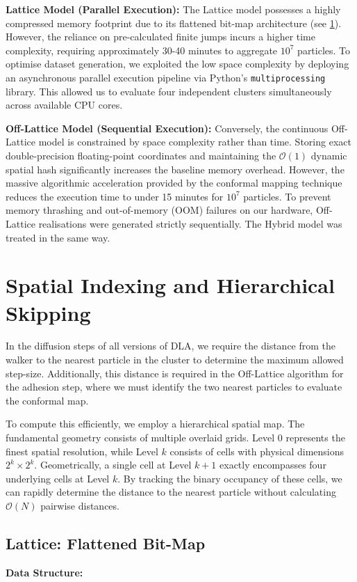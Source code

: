 \documentclass[12pt, a4paper, oneside]{report}
\theoremstyle{remark}
\begin{document}
\noindent \textbf{Lattice Model (Parallel Execution):}
The Lattice model possesses a highly compressed memory footprint due to its flattened bit-map architecture (see \cref{app:spatial_indexing}). However, the reliance on pre-calculated finite jumps incurs a higher time complexity, requiring approximately 30-40 minutes to aggregate $10^7$ particles. To optimise dataset generation, we exploited the low space complexity by deploying an asynchronous parallel execution pipeline via Python's \texttt{multiprocessing} library. This allowed us to evaluate four independent clusters simultaneously across available CPU cores.

\noindent \textbf{Off-Lattice Model (Sequential Execution):}
Conversely, the continuous Off-Lattice model is constrained by space complexity rather than time. Storing exact double-precision floating-point coordinates and maintaining the $\mathcal{O}(1)$ dynamic spatial hash significantly increases the baseline memory overhead. However, the massive algorithmic acceleration provided by the conformal mapping technique reduces the execution time to under 15 minutes for $10^7$ particles. To prevent memory thrashing and out-of-memory (OOM) failures on our hardware, Off-Lattice realisations were generated strictly sequentially. The Hybrid model was treated in the same way. 
\section{Spatial Indexing and Hierarchical Skipping}
\label{app:spatial_indexing}

In the diffusion steps of all versions of DLA, we require the distance from the walker to the nearest particle in the cluster to determine the maximum allowed step-size. Additionally, this distance is required in the Off-Lattice algorithm for the adhesion step, where we must identify the two nearest particles to evaluate the conformal map.

To compute this efficiently, we employ a hierarchical spatial map. The fundamental geometry consists of multiple overlaid grids. Level $0$ represents the finest spatial resolution, while Level $k$ consists of cells with physical dimensions $2^k \times 2^k$. Geometrically, a single cell at Level $k+1$ exactly encompasses four underlying cells at Level $k$. By tracking the binary occupancy of these cells, we can rapidly determine the distance to the nearest particle without calculating $\mathcal{O}(N)$ pairwise distances.

\subsection{Lattice: Flattened Bit-Map}
\noindent \textbf{Data Structure:} 
\end{document}
